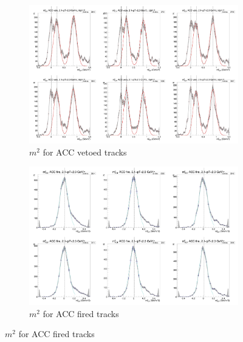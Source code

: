 \begin{figure}[H]
  \ContinuedFloat
    \begin{subfigure}{1\textwidth}
    \includegraphics[width=1\textwidth]{hiptfits/pos/PSm2_cent0_ich1_accfire0_ptbin8.jpg}
    \caption{$m^2$ for ACC vetoed tracks}
    \end{subfigure}
    \begin{subfigure}{1\textwidth}
    \includegraphics[width=1\textwidth]{hiptfits/pos/PSm2_cent0_ich1_accfire1_ptbin8.jpg}
    \caption{$m^2$ for ACC fired tracks}
    \end{subfigure}  
\end{figure}
